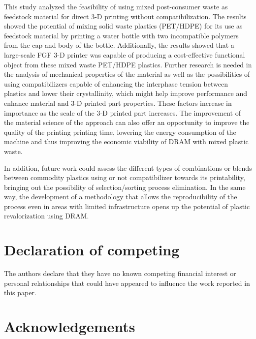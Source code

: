 \documentclass[
  12pt,
]{article}
\begin{document}
This study analyzed the feasibility of using mixed post-consumer waste
as feedstock material for direct 3-D printing without compatibilization.
The results showed the potential of mixing solid waste plastics
(PET/HDPE) for its use as feedstock material by printing a water bottle
with two incompatible polymers from the cap and body of the bottle.
Additionally, the results showed that a large-scale FGF 3-D printer was
capable of producing a cost-effective functional object from these mixed
waste PET/HDPE plastics. Further research is needed in the analysis of
mechanical properties of the material as well as the possibilities of
using compatibilizers capable of enhancing the interphase tension
between plastics and lower their crystallinity, which might help improve
performance and enhance material and 3-D printed part properties. These
factors increase in importance as the scale of the 3-D printed part
increases. The improvement of the material science of the approach can
also offer an opportunity to improve the quality of the printing
printing time, lowering the energy consumption of the machine and thus
improving the economic viability of DRAM with mixed plastic waste.

In addition, future work could assess the different types of
combinations or blends between commodity plastics using or not
compatibilizer towards its printability, bringing out the possibility of
selection/sorting process elimination. In the same way, the development
of a methodology that allows the reproducibility of the process even in
areas with limited infrastructure opens up the potential of plastic
revalorization using DRAM.

\hypertarget{declaration-of-competing}{%
\section*{Declaration of competing}\label{declaration-of-competing}}

The authors declare that they have no known competing financial interest
or personal relationships that could have appeared to influence the work
reported in this paper.

\hypertarget{acknowledgements}{%
\section*{Acknowledgements}\label{acknowledgements}}
\end{document}
